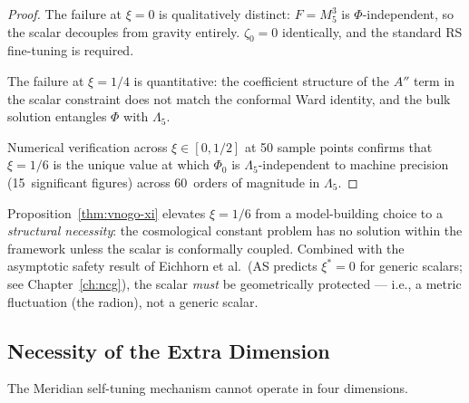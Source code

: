 \begin{proof}
The failure at $\xi = 0$ is qualitatively distinct: $F = M_5^3$ is $\Phi$-independent, so the scalar decouples from gravity entirely. $\zeta_0 = 0$ identically, and the standard RS fine-tuning is required.

The failure at $\xi = 1/4$ is quantitative: the coefficient structure of the $A''$ term in the scalar constraint does not match the conformal Ward identity, and the bulk solution entangles $\Phi$ with $\Lambda_5$.

Numerical verification across $\xi \in [0, 1/2]$ at 50 sample points confirms that $\xi = 1/6$ is the unique value at which $\Phi_0$ is $\Lambda_5$-independent to machine precision (15~significant figures) across 60~orders of magnitude in $\Lambda_5$.
\end{proof}

\begin{remark}
Proposition~\ref{thm:vnogo-xi} elevates $\xi = 1/6$ from a model-building choice to a \emph{structural necessity}: the cosmological constant problem has no solution within the framework unless the scalar is conformally coupled. Combined with the asymptotic safety result of Eichhorn et al.\ (AS predicts $\xi^* = 0$ for generic scalars; see Chapter~\ref{ch:ncg}), the scalar \emph{must} be geometrically protected --- i.e., a metric fluctuation (the radion), not a generic scalar.
\end{remark}

\subsection{Necessity of the Extra Dimension}
\label{sec:3-vnogo-5d}

\begin{proposition}
\label{thm:vnogo-5d}
The Meridian self-tuning mechanism cannot operate in four dimensions.
\end{proposition}

